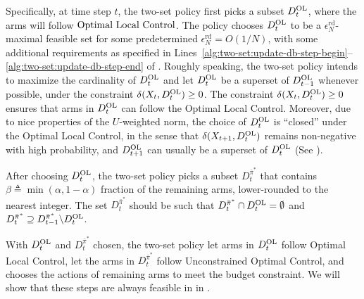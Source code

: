 \documentclass[11pt,letterpaper]{article}
\theoremstyle{plain}
\theoremstyle{definition}
\theoremstyle{remark}
\newcommand{\pibar}{{\sysbar{\pi}}}
\newcommand{\pibs}{{\pibar^*}}
\newcommand{\lppriority}{\textup{Optimal Local Control}}
\newcommand{\sysbar}[1]{\bar{#1}}
\newcommand{\umat}{U}
\newcommand{\errtol}{\epsilon_N^{\text{rd}}}
\newcommand{\Da}{D^{\pibs}}
\newcommand{\Db}{D^{\textup{OL}}}
\newcommand{\slkb}{\delta}
\begin{document}
Specifically, at time step $t$, the two-set policy first picks a subset $\Db_t$, where the arms will follow $\lppriority$. 
The policy chooses $\Db_t$ to be a $\errtol$-maximal feasible set for some predetermined $\errtol=O(1/N)$, with some additional requirements as specified in Lines~\ref{alg:two-set:update-db-step-begin}--\ref{alg:two-set:update-db-step-end} of . 
Roughly speaking, the two-set policy intends to maximize the cardinality of $\Db_t$ and let $\Db_t$ be a superset of $\Db_{t-1}$ whenever possible, under the constraint $\slkb(X_t, \Db_t) \geq 0$. 
The constraint $\slkb(X_{t}, \Db_{t}) \geq 0$ ensures that arms in $\Db_t$ can follow the Optimal Local Control. Moreover, due to nice properties of the $\umat$-weighted norm, the choice of $\Db_t$ is ``closed'' under the Optimal Local Control, in the sense that $\slkb(X_{t+1}, \Db_{t})$ remains non-negative with high probability, and $\Db_{t+1}$ can usually be a superset of $\Db_t$ (See ). 



After choosing $\Db_t$, the two-set policy picks a subset $\Da_{t}$ that contains $\beta \triangleq \min(\alpha, 1-\alpha)$ fraction of the remaining arms, lower-rounded to the nearest integer.  
The set $\Da_{t}$ should be such that $\Da_t \cap \Db_t = \emptyset$ and $\Da_{t} \supseteq \Da_{t-1} \backslash \Db_{t}$. 

With $\Db_t$ and $\Da_t$ chosen, the two-set policy let arms in $\Db_t$ follow  \lppriority, let the arms in $\Da_t$ follow  Unconstrained Optimal Control, and chooses the actions of remaining arms to meet the budget constraint. 
We will show that these steps are always feasible in  in . 
\end{document}
